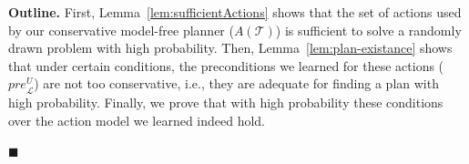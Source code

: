 \documentclass{article}
\newenvironment{proof}{\noindent{\bf Proof:~~}}{\qed}
\newcommand{\qed}{\hfill\ensuremath{\blacksquare}}
\newcommand{\pre}{\textit{pre}}
\newcommand{\MEMO}[1]
{ \fbox{
		\begin{minipage}[b]{7.9 cm}
			#1
		\end{minipage}
} }
\begin{document}
	\begin{proof}
		{\bf Outline.} First, Lemma~\ref{lem:sufficientActions} shows 
		that the set of actions used by our conservative model-free planner ($A(\mathcal{T})$) 
		is sufficient to solve a randomly drawn problem with high probability. 
		Then, Lemma~\ref{lem:plan-existance} shows that 
		under certain conditions, the preconditions we learned for these actions ($\pre_\mathcal{L}^U$) 
		are not too conservative, i.e., they are adequate
		for finding a plan with high probability.  
		Finally, we prove that with high probability these conditions over the action model we learned 
		indeed hold. 
		
		
		

\end{proof}
\end{document}
